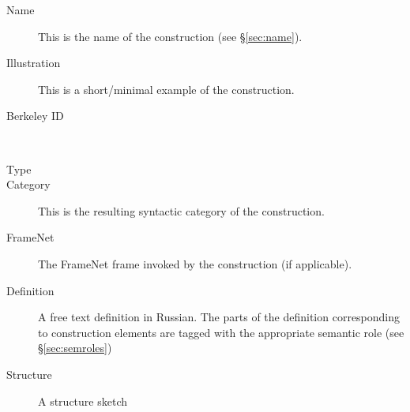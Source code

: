 \documentclass[a4paper,11pt, onecolumn,twoside]{article}
\begin{document}
\begin{description}
  \item[Name] This is the name of the construction (see §\ref{sec:name}).
  \item[Illustration] This is a short/minimal example of the construction.
  \item[Berkeley ID] ~
  \item[Type]
  \item[Category] This is the resulting syntactic category of the construction.
  \item[FrameNet] The FrameNet frame invoked by the construction (if applicable).
  \item[Definition] A free text definition in Russian. The parts of the definition 
      corresponding to construction elements are tagged with the appropriate semantic role (see §\ref{sec:semroles})
  \item[Structure] A structure sketch
\end{description}



% 
\end{document}
